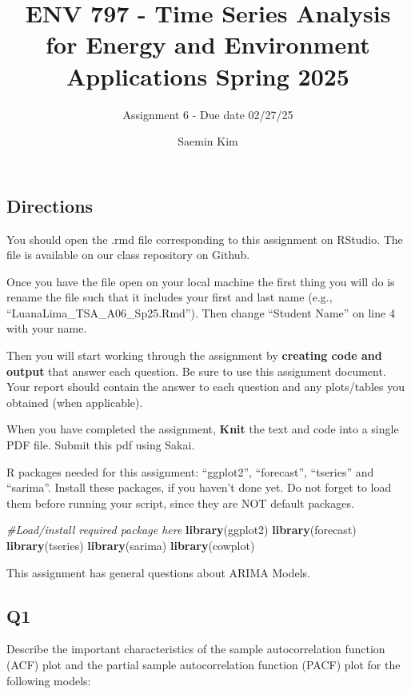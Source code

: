 \documentclass[
]{article}
\title{ENV 797 - Time Series Analysis for Energy and Environment
Applications \textbar{} Spring 2025}
\subtitle{Assignment 6 - Due date 02/27/25}
\author{Saemin Kim}
\date{}
\newenvironment{Shaded}{\begin{snugshade}}{\end{snugshade}}
\newcommand{\CommentTok}[1]{\textcolor[rgb]{0.56,0.35,0.01}{\textit{#1}}}
\newcommand{\FunctionTok}[1]{\textcolor[rgb]{0.13,0.29,0.53}{\textbf{#1}}}
\newcommand{\NormalTok}[1]{#1}
\begin{document}
\maketitle

\subsection{Directions}\label{directions}

You should open the .rmd file corresponding to this assignment on
RStudio. The file is available on our class repository on Github.

Once you have the file open on your local machine the first thing you
will do is rename the file such that it includes your first and last
name (e.g., ``LuanaLima\_TSA\_A06\_Sp25.Rmd''). Then change ``Student
Name'' on line 4 with your name.

Then you will start working through the assignment by \textbf{creating
code and output} that answer each question. Be sure to use this
assignment document. Your report should contain the answer to each
question and any plots/tables you obtained (when applicable).

When you have completed the assignment, \textbf{Knit} the text and code
into a single PDF file. Submit this pdf using Sakai.

R packages needed for this assignment: ``ggplot2'', ``forecast'',
``tseries'' and ``sarima''. Install these packages, if you haven't done
yet. Do not forget to load them before running your script, since they
are NOT default packages.

\begin{Shaded}
\begin{Highlighting}[]
\CommentTok{\#Load/install required package here}
\FunctionTok{library}\NormalTok{(ggplot2)}
\FunctionTok{library}\NormalTok{(forecast)}
\FunctionTok{library}\NormalTok{(tseries)}
\FunctionTok{library}\NormalTok{(sarima)}
\FunctionTok{library}\NormalTok{(cowplot) }
\end{Highlighting}
\end{Shaded}

This assignment has general questions about ARIMA Models.

\subsection{Q1}\label{q1}

Describe the important characteristics of the sample autocorrelation
function (ACF) plot and the partial sample autocorrelation function
(PACF) plot for the following models:
\end{document}
